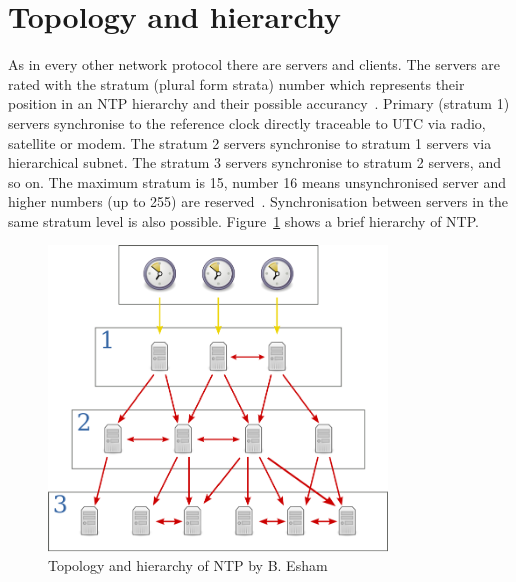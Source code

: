 
\section{Topology and hierarchy}
As in every other network protocol there are servers and clients.
The servers are rated with the stratum (plural form strata) number which represents their position
in an NTP hierarchy and their possible accurancy~\cite{rfc5905}.
Primary (stratum 1) servers synchronise to the reference clock directly traceable to UTC via
radio, satellite or modem.
The stratum 2 servers synchronise to stratum 1
servers via hierarchical subnet.
The stratum 3 servers synchronise to stratum 2 servers, and so on.
The maximum stratum is 15, number 16 means unsynchronised server
and higher numbers (up to 255) are reserved~\cite{rfc5905}.
Synchronisation between servers in the same stratum level is also possible.
Figure~\ref{fig:ntp-hierarchy} shows a brief hierarchy of NTP.
\begin{figure}
  \centering
  \includegraphics[width=9cm,keepaspectratio]{fig/Network_Time_Protocol_servers_and_clients.pdf}
  \caption{Topology and hierarchy of NTP by B. Esham}
  \label{fig:ntp-hierarchy}
  \bigskip
\end{figure}
